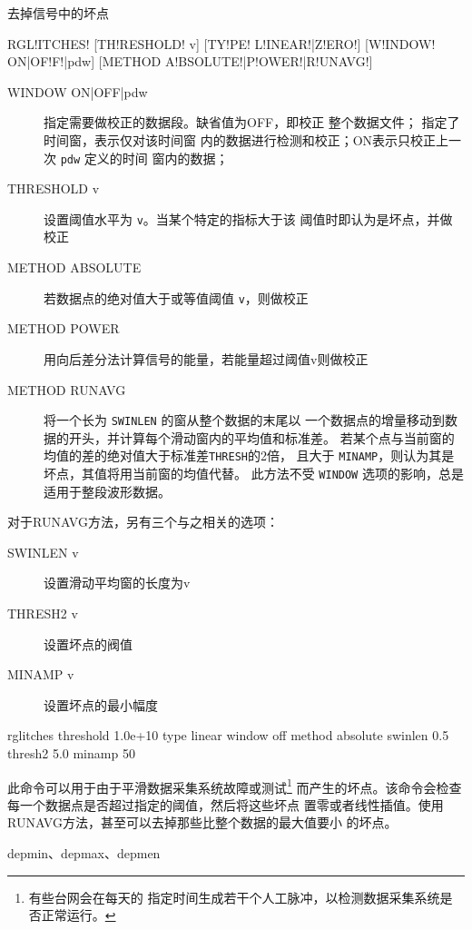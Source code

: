\label{cmd:rglitches}

去掉信号中的坏点

\begin{SACSTX}
RGL!ITCHES! [TH!RESHOLD! v] [TY!PE! L!INEAR!|Z!ERO!] [W!INDOW! ON|OF!F!|pdw]
    [METHOD A!BSOLUTE!|P!OWER!|R!UNAVG!]
\end{SACSTX}

\begin{description}
\item [WINDOW ON|OFF|pdw] 指定需要做校正的数据段。缺省值为OFF，即校正
    整个数据文件； 指定了时间窗，表示仅对该时间窗
    内的数据进行检测和校正；ON表示只校正上一次 \texttt{pdw} 定义的时间
    窗内的数据；
\item [THRESHOLD v] 设置阈值水平为 \texttt{v}。当某个特定的指标大于该
    阈值时即认为是坏点，并做校正
\item [METHOD ABSOLUTE] 若数据点的绝对值大于或等值阈值 \texttt{v}，则做校正
\item [METHOD POWER] 用向后差分法计算信号的能量，若能量超过阈值v则做校正
\item [METHOD RUNAVG] 将一个长为 \texttt{SWINLEN} 的窗从整个数据的末尾以
    一个数据点的增量移动到数据的开头，并计算每个滑动窗内的平均值和标准差。
    若某个点与当前窗的均值的差的绝对值大于标准差\texttt{THRESH}的2倍，
    且大于 \texttt{MINAMP}，则认为其是坏点，其值将用当前窗的均值代替。
    此方法不受 \texttt{WINDOW} 选项的影响，总是适用于整段波形数据。
\end{description}

对于RUNAVG方法，另有三个与之相关的选项：
\begin{description}
\item [SWINLEN v] 设置滑动平均窗的长度为v
\item [THRESH2 v] 设置坏点的阀值
\item [MINAMP v] 设置坏点的最小幅度
\end{description}

\begin{SACDFT}
rglitches threshold 1.0e+10 type linear window off method absolute
    swinlen 0.5 thresh2 5.0 minamp 50
\end{SACDFT}

此命令可以用于由于平滑数据采集系统故障或测试\footnote{有些台网会在每天的
指定时间生成若干个人工脉冲，以检测数据采集系统是否正常运行。}
而产生的坏点。该命令会检查每一个数据点是否超过指定的阈值，然后将这些坏点
置零或者线性插值。使用RUNAVG方法，甚至可以去掉那些比整个数据的最大值要小
的坏点。

depmin、depmax、depmen
